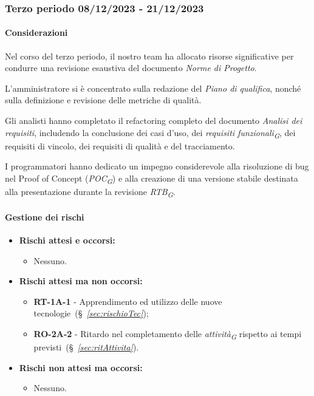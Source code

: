 

\subsubsection{Terzo periodo  08/12/2023 - 21/12/2023}
\paragraph{Considerazioni}
Nel corso del terzo periodo, il nostro team ha allocato risorse significative per condurre una revisione esaustiva del documento \textit{Norme di Progetto}.

\vspace{0.2cm}

L'amministratore si è concentrato sulla redazione del \textit{Piano di qualifica}, nonché sulla definizione e revisione delle metriche di qualità. 

\vspace{0.2cm}

Gli analisti hanno completato il refactoring completo del documento \textit{Analisi dei requisiti}, includendo la conclusione dei casi d'uso, dei \textit{requisiti funzionali}\textsubscript{\textit{G}}, dei requisiti di vincolo, dei requisiti di qualità e del tracciamento.

\vspace{0.2cm}

I programmatori hanno dedicato un impegno considerevole alla risoluzione di bug nel Proof of Concept (\textit{POC}\textsubscript{\textit{G}}) e alla creazione di una versione stabile destinata alla presentazione durante la revisione \textit{RTB}\textsubscript{\textit{G}}.

\paragraph{Gestione dei rischi} 

\begin{itemize}
    \item \textbf{Rischi attesi e occorsi:}
\begin{itemize}
    \item Nessuno.
\end{itemize}
\item \textbf{Rischi attesi ma non occorsi:}
 \begin{itemize}
    \item \textbf{RT-1A-1} - Apprendimento ed utilizzo delle nuove tecnologie~(\S~\textit{\ref{sec:rischioTec}});
    \item \textbf{RO-2A-2} - Ritardo nel completamento delle \textit{attività}\textsubscript{\textit{G}} rispetto ai tempi previsti~(\S~\textit{\ref{sec:ritAttivita}}).
\end{itemize}
\item \textbf{Rischi non attesi ma occorsi:}
\begin{itemize}
    \item Nessuno.
\end{itemize}
\end{itemize}
